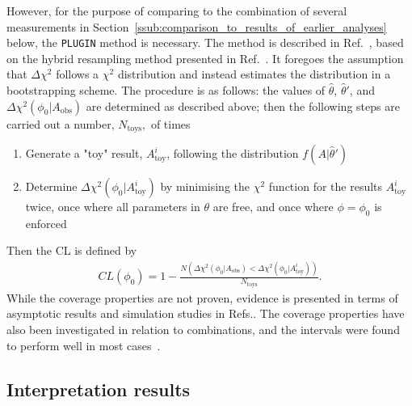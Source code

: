 However, for the purpose of comparing to the combination of several \lhcb measurements in Section~\ref{ssub:comparison_to_results_of_earlier_analyses} below, the \texttt{PLUGIN} method is necessary. The method is described in Ref.~\cite{senUnifiedMethodNuisance2009}, based on the hybrid resampling method presented in Ref.~\cite{chuangResamplingMethodsConfidence1998,*chuangHybridResamplingMethods2000}. It foregoes the assumption that $\Delta \chi^2$ follows a $\chi^2$ distribution and instead estimates the distribution in a bootstrapping scheme. The procedure is as follows: the values of $\hat \theta$, $\hat \theta'$, and $\Delta \chi^2(\phi_0|A_\mathrm{obs})$ are determined as described above; then the following steps are carried out a number, $N_\mathrm{toys}, $ of times
\begin{enumerate}
    \item Generate a "toy" result, $A^i_\mathrm{toy}$, following the distribution $f(A|\hat\theta')$
    \item Determine $\Delta \chi^2(\phi_0|A^i_\mathrm{toy})$ by minimising the $\chi^2$ function for the results $A^i_\mathrm{toy}$ twice, once where all parameters in $\theta$ are free, and once where $\phi=\phi_0$ is enforced
\end{enumerate}
Then the CL is defined by
\begin{align}
    CL(\phi_0) = 1-\frac{N(\Delta \chi^2(\phi_0|A_\mathrm{obs}) < \Delta \chi^2(\phi_0|A^i_\mathrm{toy}))}{N_\mathrm{toys}}.
\end{align}
While the coverage properties are not proven, evidence is presented in terms of asymptotic results and simulation studies in Refs.\cite{senUnifiedMethodNuisance2009,chuangResamplingMethodsConfidence1998,*chuangHybridResamplingMethods2000}. The coverage properties have also been investigated in relation to \lhcb combinations, and the intervals were found to perform well in most cases~\cite{LHCb-PAPER-2016-032}.

\subsection{Interpretation results} %
\label{sub:interpretation_results}


